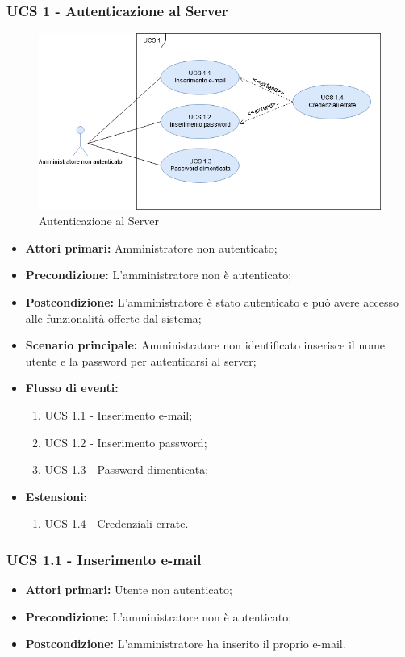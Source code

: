 \subsubsection{UCS 1 - Autenticazione al Server}
\begin{figure}[h]
    \centering
    \includegraphics[scale=0.6]{sezioni/UseCase/Immagini/UCS1.png}
    \caption{Autenticazione al Server}
\end{figure}

\begin{itemize}
\item \textbf{Attori primari:} Amministratore non autenticato;
\item \textbf{Precondizione:} L'amministratore non è autenticato;
\item \textbf{Postcondizione:} L'amministratore è stato autenticato e può avere accesso alle funzionalità offerte dal sistema;
\item \textbf{Scenario principale:} Amministratore non identificato inserisce il nome utente e la password per autenticarsi al server;
\item \textbf{Flusso di eventi:}
    \begin{enumerate}
        \item UCS 1.1 - Inserimento e-mail;
        \item UCS 1.2 - Inserimento password;
        \item UCS 1.3 - Password dimenticata;
    \end{enumerate}
\item \textbf{Estensioni:}
	\begin{enumerate}		
		\item UCS 1.4 - Credenziali errate.
	\end{enumerate}
\end{itemize}

\subsubsection{UCS 1.1 - Inserimento e-mail}%
\begin{itemize}
\item \textbf{Attori primari:} Utente non autenticato;
\item \textbf{Precondizione:} L'amministratore non è autenticato;
\item \textbf{Postcondizione:} L'amministratore ha inserito il proprio e-mail.
\end{itemize}

